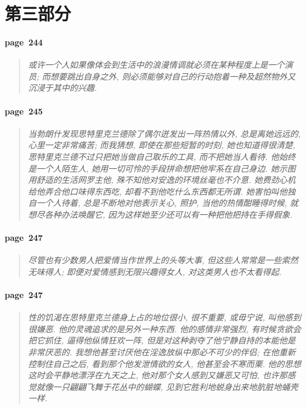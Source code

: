 \section{第三部分}

\paragraph*{page~244}
\begin{quotation}
    \itshape
    或许一个人如果像体会到生活中的浪漫情调就必须在某种程度上是一个演员; 而想要跳出自身之外, 则必须能够对自己的行动抱着一种及超然物外又沉浸于其中的兴趣. 
\end{quotation}

\paragraph*{page~245}
\begin{quotation}
    \itshape
    当勃朗什发现思特里克兰德除了偶尔迸发出一阵热情以外, 总是离她远远的, 心里一定非常痛苦; 而我猜想, 即使在那些短暂的时刻, 她也知道得很清楚, 思特里克兰德不过只把她当做自己取乐的工具, 而不把她当人看待. 他始终是一个人陌生人, 她用一切可怜的手段拼命想把他牢系在自己身边. 她示图用舒适的生活网罗主他, 殊不知他对安逸的环境丝毫也不介意. 她费劲心机给他弄合他口味得东西吃, 却看不到他吃什么东西都无所谓. 她害怕叫他独自一个人待着, 总是不断地对他表示关心, 照护, 当他的热情酣睡得时候, 就想尽各种办法唤醒它, 因为这样她至少还可以有一种把他把持在手得假象. 
\end{quotation}

\paragraph*{page~247}
\begin{quotation}
    \itshape
    尽管也有少数男人把爱情当作世界上的头等大事, 但这些人常常是一些索然无味得人; 即便对爱情感到无限兴趣得女人, 对这类男人也不太看得起. 
\end{quotation}

\paragraph*{page~247}
\begin{quotation}
    \itshape
    性的饥渴在思特里克兰德身上占的地位很小, 很不重要, 或毋宁说, 叫他感到很嫌恶. 他的灵魂追求的是另外一种东西. 他的感情非常强烈, 有时候贪欲会把它抓住, 逼得他纵情狂欢一阵, 但是对这种剥夺了他宁静自持的本能他是非常厌恶的. 我想他甚至讨厌他在淫逸放纵中那必不可少的伴侣; 在他重新控制住自己之后, 看到那个他发泄情欲的女人, 他甚至会不寒而栗. 他的思想这时会平静地漂浮在九天之上, 他对那个女人感到又嫌恶又可怕, 也许那感觉就像一只翩翩飞舞于花丛中的蝴蝶, 见到它胜利地蜕身出来地肮脏地蛹壳一样. 
\end{quotation}

